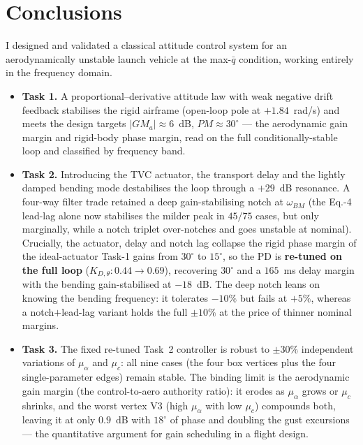 \documentclass[../main.tex]{subfiles}
\begin{document}
\section{Conclusions}\label{sec:conclusions}

I designed and validated a classical attitude control system for an
aerodynamically unstable launch vehicle at the max-$\bar q$ condition, working
entirely in the frequency domain.

\begin{itemize}
\item \textbf{Task 1.} A proportional--derivative attitude law with weak negative
drift feedback stabilises the rigid airframe (open-loop pole at
$+1.84$~rad/s) and meets the design targets $|GM_a|\approx 6$~dB,
$PM\approx 30^\circ$ --- the aerodynamic gain margin and rigid-body phase margin,
read on the full conditionally-stable loop and classified by frequency band.
\item \textbf{Task 2.} Introducing the TVC actuator, the transport delay and the
lightly damped bending mode destabilises the loop through a $+29$~dB resonance.
A four-way filter trade retained a deep gain-stabilising notch at $\omega_{BM}$
(the Eq.-4 lead-lag alone now stabilises the milder peak in $45/75$ cases, but
only marginally, while a notch triplet over-notches and goes unstable at
nominal). Crucially, the actuator, delay and notch lag collapse the rigid phase
margin of the ideal-actuator Task-1 gains from $30^\circ$ to $15^\circ$, so the
PD is \textbf{re-tuned on the full loop} ($K_{D,\theta}: 0.44\to0.69$),
recovering $30^\circ$ and a $165$~ms delay margin with the bending gain-stabilised
at $-18$~dB. The deep notch leans on knowing the bending frequency: it tolerates
$-10\%$ but fails at $+5\%$, whereas a notch$+$lead-lag variant holds the full
$\pm 10\%$ at the price of thinner nominal margins.
\item \textbf{Task 3.} The fixed re-tuned Task~2 controller is robust to
$\pm 30\%$ independent variations of $\mu_\alpha$ and $\mu_c$: all nine cases
(the four box vertices plus the four single-parameter edges) remain stable. The binding limit is the aerodynamic gain
margin (the control-to-aero authority ratio): it erodes as $\mu_\alpha$ grows or
$\mu_c$ shrinks, and the worst vertex V3 (high $\mu_\alpha$ with low $\mu_c$)
compounds both, leaving it at only $0.9$~dB with $18^\circ$ of phase and doubling
the gust excursions --- the quantitative argument for gain scheduling in a flight
design.
\end{itemize}
\end{document}
